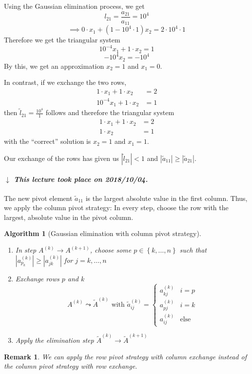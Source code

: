 \documentclass[a4paper]{article}
\newcounter{lecref}[section]
\numberwithin{lecref}{section}
\theoremstyle{break}
\newtheorem{remark}[lecref]{Remark}
\newtheorem{algorithm}{Algorithm}
\newcommand{\dateref}[1]{%
  \begin{mdframed}[backgroundcolor=gray!10,innerbottommargin=0pt,innertopmargin=0pt]
    \paragraph{\textit{$\downarrow$ This lecture took place on #1.}}%
  \end{mdframed}%
}
\newcommand{\Abs}[1]{\left|#1\right|}
\newcommand{\Set}[1]{\left\{#1\right\}}
\begin{document}
Using the Gaussian elimination process, we get
\[ l_{21} = \frac{a_{21}}{a_{11}} = 10^4 \]
\[ \implies 0 \cdot x_1 + (1 - 10^4 \cdot 1) x_2 = 2 \cdot 10^4 \cdot 1 \]
Therefore we get the triangular system
\[ 10^{-4} x_1 + 1 \cdot x_2 = 1 \]
\[ -10^4 x_2 = -10^4 \]
By this, we get an approximation $x_2 = 1$ and $x_1 = 0$.

In contrast, if we exchange the two rows,
\begin{align*}
  1 \cdot x_1 + 1 \cdot x_2 &= 2 \\
  10^{-4} x_1 + 1 \cdot x_2 &= 1
\end{align*}
then $\tilde{l}_21 = \frac{10^4}{1}$ follows and therefore the triangular system
\begin{align*}
  1 \cdot x_1 + 1 \cdot x_2 &= 2 \\
  1 \cdot x_2 &= 1
\end{align*}
with the \enquote{correct} solution is $x_2 = 1$ and $x_1 = 1$.

Our exchange of the rows has given us $\Abs{\tilde{l}_{21}} < 1$ and $\Abs{\tilde{a}_{11}} \geq \Abs{\tilde{a}_{21}}$.

\dateref{2018/10/04}
The new pivot element $\tilde{a}_{11}$ is the largest absolute value in the first column.
Thus, we apply the column pivot strategy: In every step, choose the row with the largest, absolute value in the pivot column.

\begin{algorithm}[Gaussian elimination with column pivot strategy]\hfill{}
  \label{algo2}
  \begin{enumerate}
    \item In step $A^{(k)} \to A^{(k+1)}$, choose some $p \in \Set{k, \dots, n}$ such that $\Abs{a_{p_k}^{(k)}} \geq \Abs{a_{jk}^{(k)}}$ for $j = k, \dots, n$
    \item Exchange rows $p$ and $k$
      \[
        A^{(k)} \leadsto \tilde{A}^{(k)} \text{ with } \tilde{a}_{ij}^{(k)}
        = \begin{cases}
          a_{kj}^{(k)} & i = p \\
          a_{pj}^{(k)} & i = k \\
          a_{ij}^{(k)} & \text{else}
        \end{cases}
      \]
    \item Apply the elimination step $\tilde{A}^{(k)} \to \tilde{A}^{(k+1)}$
  \end{enumerate}
\end{algorithm}

\begin{remark} %
  We can apply the row pivot strategy with column exchange
  instead of the column pivot strategy with row exchange.
\end{remark}
\end{document}
